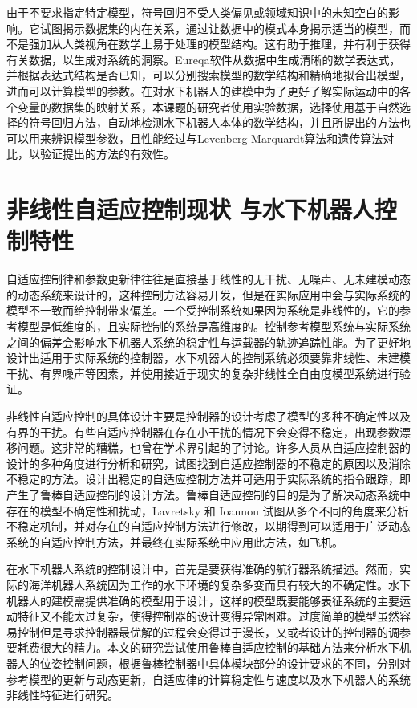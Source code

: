 由于不要求指定特定模型，符号回归不受人类偏见或领域知识中的未知空白的影响。它试图揭示数据集的内在关系，通过让数据中的模式本身揭示适当的模型，而不是强加从人类视角在数学上易于处理的模型结构。这有助于推理，并有利于获得有关数据，以生成对系统的洞察。Eureqa软件从数据中生成清晰的数学表达式，并根据表达式结构是否已知，可以分别搜索模型的数学结构和精确地拟合出模型，进而可以计算模型的参数\cite{stoutemyer2013can}。在对水下机器人的建模中为了更好了解实际运动中的各个变量的数据集的映射关系，本课题的研究者使用实验数据，选择使用基于自然选择的符号回归方法，自动地检测水下机器人本体的数学结构，并且所提出的方法也可以用来辨识模型参数，且性能经过与Levenberg-Marquardt算法和遗传算法对比，以验证提出的方法的有效性\cite{wu2016parametric,Moreno2015Symbolic}。


\section{非线性自适应控制现状 与水下机器人控制特性 }

自适应控制律和参数更新律往往是直接基于线性的无干扰、无噪声、无未建模动态的动态系统来设计的，这种控制方法容易开发，但是在实际应用中会与实际系统的模型不一致而给控制带来偏差。一个受控制系统如果因为系统是非线性的，它的参考模型是低维度的，且实际控制的系统是高维度的\cite{russdrakebook}。控制参考模型系统与实际系统之间的偏差会影响水下机器人系统的稳定性与运载器的轨迹追踪性能\cite{li2005design,jun2009development,garcia2014modelling,wang2016fast}。为了更好地设计出适用于实际系统的控制器，水下机器人的控制系统必须要靠非线性、未建模干扰、有界噪声等因素，并使用接近于现实的复杂非线性全自由度模型系统进行验证。

非线性自适应控制的具体设计主要是控制器的设计考虑了模型的多种不确定性以及有界的干扰。有些自适应控制器在存在小干扰的情况下会变得不稳定，出现参数漂移问题。这非常的糟糕，也曾在学术界引起的了讨论。许多人员从自适应控制器的设计的多种角度进行分析和研究，试图找到自适应控制器的不稳定的原因以及消除不稳定的方法。设计出稳定的自适应控制方法并可适用于实际系统的指令跟踪，即产生了鲁棒自适应控制的设计方法。鲁棒自适应控制的目的是为了解决动态系统中存在的模型不确定性和扰动，Lavretsky 和 Ioannou 试图从多个不同的角度来分析不稳定机制，并对存在的自适应控制方法进行修改，以期得到可以适用于广泛动态系统的自适应控制方法，并最终在实际系统中应用此方法，如飞机\cite{lavretsky2013robust,Ioannou2012}。

在水下机器人系统的控制设计中，首先是要获得准确的航行器系统描述。然而，实际的海洋机器人系统因为工作的水下环境的复杂多变而具有较大的不确定性。水下机器人的建模需提供准确的模型用于设计，这样的模型既要能够表征系统的主要运动特征又不能太过复杂，使得控制器的设计变得异常困难\cite{fossen1991nonlinear,beinset2007controller,eriksen2015horizontal}。过度简单的模型虽然容易控制但是寻求控制器最优解的过程会变得过于漫长，又或者设计的控制器的调参要耗费很大的精力\cite{sutton1998reinforcement,madady2008pid}。本文的研究尝试使用鲁棒自适应控制的基础方法来分析水下机器人的位姿控制问题，根据鲁棒控制器中具体模块部分的设计要求的不同，分别对参考模型的更新与动态更新，自适应律的计算稳定性与速度以及水下机器人的系统非线性特征进行研究。


